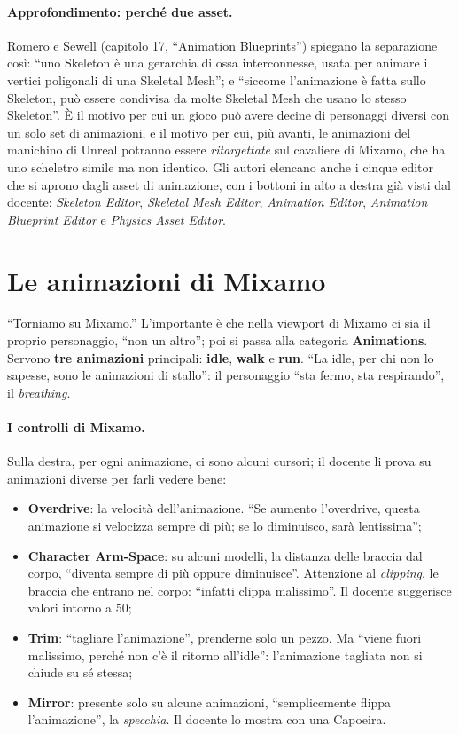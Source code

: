 \paragraph{Approfondimento: perché due asset.} Romero e Sewell (capitolo 17, ``Animation
Blueprints'') spiegano la separazione così: ``uno Skeleton è una gerarchia di ossa
interconnesse, usata per animare i vertici poligonali di una Skeletal Mesh''; e
``siccome l'animazione è fatta sullo Skeleton, può essere condivisa da molte Skeletal
Mesh che usano lo stesso Skeleton''. È il motivo per cui un gioco può avere decine di
personaggi diversi con un solo set di animazioni, e il motivo per cui, più avanti, le
animazioni del manichino di Unreal potranno essere \emph{ritargettate} sul cavaliere di
Mixamo, che ha uno scheletro simile ma non identico. Gli autori elencano anche i cinque
editor che si aprono dagli asset di animazione, con i bottoni in alto a destra già visti
dal docente: \emph{Skeleton Editor}, \emph{Skeletal Mesh Editor}, \emph{Animation
Editor}, \emph{Animation Blueprint Editor} e \emph{Physics Asset Editor}.

\section{Le animazioni di Mixamo}
\label{ue8:sec:mixamoanim}

``Torniamo su Mixamo.'' L'importante è che nella viewport di Mixamo ci sia il proprio
personaggio, ``non un altro''; poi si passa alla categoria \textbf{Animations}. Servono
\textbf{tre animazioni} principali: \textbf{idle}, \textbf{walk} e \textbf{run}. ``La
idle, per chi non lo sapesse, sono le animazioni di stallo'': il personaggio ``sta fermo,
sta respirando'', il \emph{breathing}.

\paragraph{I controlli di Mixamo.} Sulla destra, per ogni animazione, ci sono alcuni
cursori; il docente li prova su animazioni diverse per farli vedere bene:
\begin{itemize}
  \item \textbf{Overdrive}: la velocità dell'animazione. ``Se aumento l'overdrive,
        questa animazione si velocizza sempre di più; se lo diminuisco, sarà
        lentissima'';
  \item \textbf{Character Arm-Space}: su alcuni modelli, la distanza delle braccia dal
        corpo, ``diventa sempre di più oppure diminuisce''. Attenzione al
        \emph{clipping}, le braccia che entrano nel corpo: ``infatti clippa
        malissimo''. Il docente suggerisce valori intorno a 50;
  \item \textbf{Trim}: ``tagliare l'animazione'', prenderne solo un pezzo. Ma ``viene
        fuori malissimo, perché non c'è il ritorno all'idle'': l'animazione tagliata non
        si chiude su sé stessa;
  \item \textbf{Mirror}: presente solo su alcune animazioni, ``semplicemente flippa
        l'animazione'', la \emph{specchia}. Il docente lo mostra con una Capoeira.
\end{itemize}

